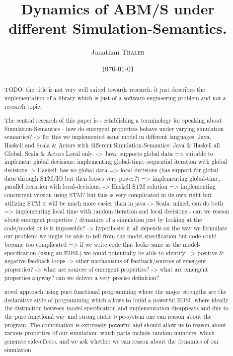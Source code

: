 \documentclass{article}
\title{Dynamics of ABM/S under different Simulation-Semantics.} %
\author{Jonathan \textsc{Thaler}} %
\date{\today} %
\begin{document}
\maketitle %

\begin{abstract}
TODO: the title is not very well suited towards research: it just describes the implementation of a library which is just of a software-engineering problem and not a research topic.



The central research of this paper is
- establishing a terminology for speaking about Simulation-Semantics
- how do emergent properties behave under varying simulation semantics?
	-> for this we implemented same model in different languages: Java, Haskell and Scala & Actors with different Simulation-Semantics: Java & Haskell all Global, Scala & Actors Local only.
	-> Java: supports global data => suitable to implement global decisions: implementing global-time, sequential iteration with global decisions
	-> Haskell: has no global data => local decisions (has support for global data through STM/IO but then looses very power?) => implementing global-time, parallel iteration with local-decisions. 
		-> Haskell STM solution => implementing concurrent version using STM? but this is very complicated in its own right but utilizing STM it will be much more easier than in java
	-> Scala: mixed, can do both => implementing local time with random iteration and local decisions
- can we reason about emergent properties / dynamics of a simulation just by looking at the code/model or is it impossible?
	-> hypothesis: it all depends on the way we formulate our problem: we might be able to tell from the model-specification but code could become too complicated
		=> if we write code that looks same as the model-specification (using an EDSL) we could potentially be able to identify:
			-> positive & negative feedback-loops 
			-> other mechanisms of feedback/sources of emergent properties?
				-> what are sources of emergent properties?
					-> what are emergent properties anyway? can we deliver a very precise definition?

novel approach using pure functional programming where the major strengths are the declarative style of programming which allows to build a powerful EDSL where ideally the distinction between model-specification and implementation disappears and due to the pure functional way and strong static type-system one can reason about the program. The combination is extremely powerful and should allow us to reason about various properties of our simulation: which parts include random-numbers, which generate side-effects, and we ask whether we can reason about the dynamics of our simulation.





\end{abstract}
\end{document}
